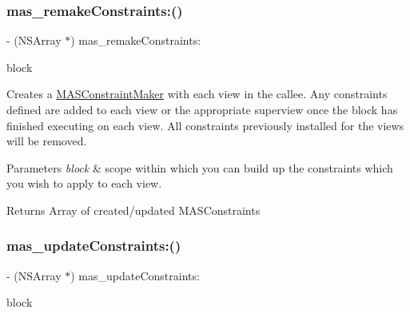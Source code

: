 \subsubsection{\texorpdfstring{mas\+\_\+remake\+Constraints\+:()}{mas\_remakeConstraints:()}}
{\footnotesize\ttfamily -\/ (N\+S\+Array $\ast$) mas\+\_\+remake\+Constraints\+: \begin{DoxyParamCaption}\item[{(void($^\wedge$)(\mbox{\hyperlink{interface_m_a_s_constraint_maker}{M\+A\+S\+Constraint\+Maker}} $\ast$make))}]{block }\end{DoxyParamCaption}}

Creates a \mbox{\hyperlink{interface_m_a_s_constraint_maker}{M\+A\+S\+Constraint\+Maker}} with each view in the callee. Any constraints defined are added to each view or the appropriate superview once the block has finished executing on each view. All constraints previously installed for the views will be removed.


\begin{DoxyParams}{Parameters}
{\em block} & scope within which you can build up the constraints which you wish to apply to each view.\\
\hline
\end{DoxyParams}
\begin{DoxyReturn}{Returns}
Array of created/updated M\+A\+S\+Constraints 
\end{DoxyReturn}
\mbox{\label{category_n_s_array_07_m_a_s_additions_08_a54c3e226bebbf0052f0b5c247fce4956}} 
\subsubsection{\texorpdfstring{mas\+\_\+update\+Constraints\+:()}{mas\_updateConstraints:()}}
{\footnotesize\ttfamily -\/ (N\+S\+Array $\ast$) mas\+\_\+update\+Constraints\+: \begin{DoxyParamCaption}\item[{(void($^\wedge$)(\mbox{\hyperlink{interface_m_a_s_constraint_maker}{M\+A\+S\+Constraint\+Maker}} $\ast$make))}]{block }\end{DoxyParamCaption}}

